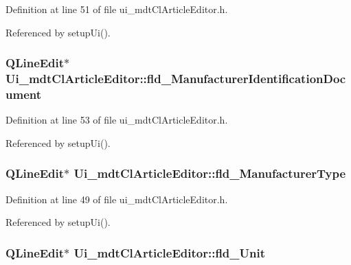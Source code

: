 Definition at line 51 of file ui\-\_\-mdt\-Cl\-Article\-Editor.\-h.



Referenced by setup\-Ui().

\hypertarget{class_ui__mdt_cl_article_editor_adbf2f36e8f78d0371cd4f2b7b9fc06ad}{
\subsubsection[{fld\-\_\-\-Manufacturer\-Identification\-Document}]{\setlength{\rightskip}{0pt plus 5cm}Q\-Line\-Edit$\ast$ Ui\-\_\-mdt\-Cl\-Article\-Editor\-::fld\-\_\-\-Manufacturer\-Identification\-Document}}\label{class_ui__mdt_cl_article_editor_adbf2f36e8f78d0371cd4f2b7b9fc06ad}


Definition at line 53 of file ui\-\_\-mdt\-Cl\-Article\-Editor.\-h.



Referenced by setup\-Ui().

\hypertarget{class_ui__mdt_cl_article_editor_ac3182773dbe0e49bbc82ea9aa967b1b3}{
\subsubsection[{fld\-\_\-\-Manufacturer\-Type}]{\setlength{\rightskip}{0pt plus 5cm}Q\-Line\-Edit$\ast$ Ui\-\_\-mdt\-Cl\-Article\-Editor\-::fld\-\_\-\-Manufacturer\-Type}}\label{class_ui__mdt_cl_article_editor_ac3182773dbe0e49bbc82ea9aa967b1b3}


Definition at line 49 of file ui\-\_\-mdt\-Cl\-Article\-Editor.\-h.



Referenced by setup\-Ui().

\hypertarget{class_ui__mdt_cl_article_editor_a75c92c53cd2ce801cd5bb48a0f501216}{
\subsubsection[{fld\-\_\-\-Unit}]{\setlength{\rightskip}{0pt plus 5cm}Q\-Line\-Edit$\ast$ Ui\-\_\-mdt\-Cl\-Article\-Editor\-::fld\-\_\-\-Unit}}\label{class_ui__mdt_cl_article_editor_a75c92c53cd2ce801cd5bb48a0f501216}


